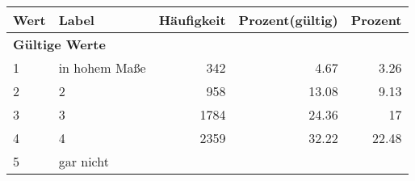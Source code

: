      \begin{longtable}{lXrrr}
     \toprule
     \textbf{Wert} & \textbf{Label} & \textbf{Häufigkeit} & \textbf{Prozent(gültig)} & \textbf{Prozent} \\
     \endhead
     \midrule
     \multicolumn{5}{l}{\textbf{Gültige Werte}}\\

     1 &
     \multicolumn{1}{X}{ in hohem Maße   } &


       \num{342} &
       \num[round-mode=places,round-precision=2]{4,67} &
         \num[round-mode=places,round-precision=2]{3,26} \\

     2 &
     \multicolumn{1}{X}{ 2   } &


       \num{958} &
       \num[round-mode=places,round-precision=2]{13,08} &
         \num[round-mode=places,round-precision=2]{9,13} \\

     3 &
     \multicolumn{1}{X}{ 3   } &


       \num{1784} &
       \num[round-mode=places,round-precision=2]{24,36} &
         \num[round-mode=places,round-precision=2]{17} \\

     4 &
     \multicolumn{1}{X}{ 4   } &


       \num{2359} &
       \num[round-mode=places,round-precision=2]{32,22} &
         \num[round-mode=places,round-precision=2]{22,48} \\

     5 &
     \multicolumn{1}{X}{ gar nicht   } &



\end{longtable}

